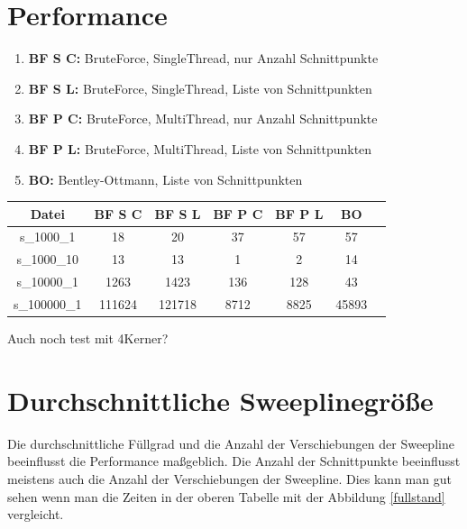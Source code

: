 \documentclass[conference]{IEEEtran}
\begin{document}
	
	\section{Performance}
	
	\begin{enumerate}
		\item \textbf{BF S C:} BruteForce, SingleThread, nur Anzahl Schnittpunkte
		\item \textbf{BF S L:} BruteForce, SingleThread, Liste von Schnittpunkten
		\item \textbf{BF P C:} BruteForce, MultiThread, nur Anzahl Schnittpunkte
		\item \textbf{BF P L:} BruteForce, MultiThread, Liste von Schnittpunkten
		\item \textbf{BO:} Bentley-Ottmann, Liste von Schnittpunkten
	\end{enumerate}

	\begin{table}
		\small
		\begin{tabular}{|c|c|c|c|c|c|c|}
			\hline
			Datei & BF S C & BF S L & BF P C & BF P L & BO \\
			\hline
			s\_1000\_1 & 18 & 20 & 37 & 57 & 57\\
			\hline
			s\_1000\_10 & 13 & 13 & 1 & 2 & 14\\
			\hline
			s\_10000\_1 & 1263 & 1423 & 136 & 128 & 43\\
			\hline
			s\_100000\_1 & 111624 & 121718 & 8712 & 8825 & 45893\\%
			\hline
		\end{tabular}
	\end{table}

	Auch noch test mit 4Kerner?

	
	\section{Durchschnittliche Sweeplinegröße}
	Die durchschnittliche Füllgrad und die Anzahl der Verschiebungen der Sweepline beeinflusst die Performance maßgeblich. Die Anzahl der Schnittpunkte beeinflusst meistens auch die Anzahl der Verschiebungen der Sweepline. Dies kann man gut sehen wenn man die Zeiten in der oberen Tabelle mit der Abbildung \ref{fullstand} vergleicht. 
\end{document}
